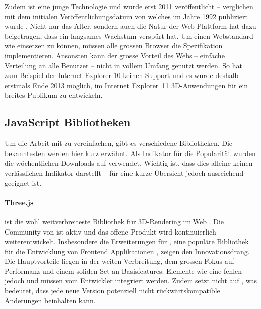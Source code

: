 Zudem ist  eine junge Technologie und wurde erst 2011 veröffentlicht \cite{webGl1Spec} – verglichen mit dem initialen Veröffentlichungsdatum von  welches im Jahre 1992 publiziert wurde \cite{openGlSpec}.
Nicht nur das Alter, sondern auch die Natur der Web-Plattform hat dazu beigetragen, dass  ein langsames Wachstum verspürt hat. Um einen Webstandard wie  einsetzen zu können, müssen alle grossen Browser die Spezifikation implementieren. Ansonsten kann der grosse Vorteil des Webs – einfache Verteilung an alle Benutzer – nicht in vollem Umfang genutzt werden. So hat zum Beispiel der Internet Explorer 10 keinen Support und es wurde deshalb erstmals Ende 2013 möglich, im Internet Explorer 11 3D-Anwendungen für ein breites Publikum zu entwickeln.

\subsection{JavaScript Bibliotheken}
Um die Arbeit mit  zu vereinfachen, gibt es verschiedene  Bibliotheken. Die bekanntesten werden hier kurz erwähnt. Als Indikator für die Popularität wurden die wöchentlichen Downloads auf  verwendet. Wichtig ist, dass dies alleine keinen verlässlichen Indikator darstellt – für eine kurze Übersicht jedoch ausreichend geeignet ist.

\paragraph{Three.js}
 ist die wohl weitverbreiteste Bibliothek für 3D-Rendering im Web \cite{threeNpmPackage}.
Die Community von  ist aktiv und das offene Produkt wird kontinuierlich weiterentwickelt. Insbesondere die Erweiterungen \cite{threeFiberGithub} für , eine populäre Bibliothek für die Entwicklung von Frontend Applikationen \cite{reactNpmPackage}, zeigen den Innovationsdrang.
Die Hauptvorteile liegen in der weiten Verbreitung, dem grossen Fokus auf Performanz und einem soliden Set an Basisfeatures. Elemente wie eine  fehlen jedoch und müssen vom Entwickler integriert werden. Zudem setzt  nicht auf , was bedeutet, dass jede neue Version potenziell nicht rückwärtskompatible Änderungen beinhalten kann.

